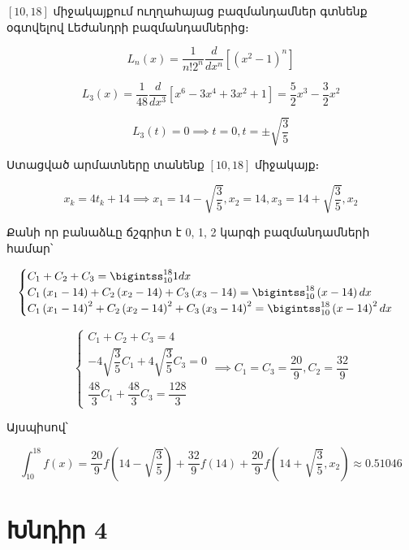 \documentclass{article}
\begin{document}
\begin{enumerate}
$\left[10, 18\right]$ միջակայքում ուղղահայաց բազմանդամներ գտնենք օգտվելով Լեժանդրի բազմանդամներից։

			$$L_n\left(x\right) = \dfrac{1}{n ! 2 ^ {n}} \frac{d}{d x^{n}} \left[\left(x ^ {2} - 1\right) ^ {n} \right]$$

			$$L_3\left(x\right) = \dfrac{1}{48}\dfrac{d}{dx^{3}}\left[x ^ {6} - 3x^4 + 3x^2 +1\right] = \dfrac{5}{2} x^{3} - \dfrac{3}{2} x ^ {2}$$

			$$L_3\left(t\right) = 0 \implies t = 0, t = \pm \sqrt{\dfrac{3}{5}}$$

 
Ստացված արմատները տանենք $\left[10, 18\right]$ միջակայք։

							$$x_{k} = 4 t_{k} + 14 \implies x_{1} = 14 - \sqrt{\dfrac{3}{5}}, x_{2} = 14, x_{3} = 14 + \sqrt{\dfrac{3}{5}}, x_{2}$$


Քանի որ բանաձևը ճշգրիտ է 0, 1, 2 կարգի բազմանդամների համար՝

$$
\begin{cases}
 C_{1} + C_{2} + C_{3} = \bigintss_{10}^{18}1dx \\
 C_{1}\left(x_{1} - 14\right) + C_{2}\left(x_{2} - 14\right) + C_{3}\left(x_{3} - 14\right) = \bigintss_{10}^{18}\left(x - 14\right)dx \\
 C_{1}\left(x_{1} - 14\right)^{2} + C_{2}\left(x_{2} - 14\right)^{2} + C_{3}\left(x_{3} - 14\right)^{2} = \bigintss_{10}^{18}\left(x - 14\right)^{2}dx

\end{cases}
$$

$$
\begin{cases}
 C_{1} + C_{2} + C_{3} = 4 \\
 -4\sqrt{\dfrac{3}{5}}C_{1}  + 4\sqrt{\dfrac{3}{5}} C_{3} = 0\\
\dfrac{48}{3}C_{1}+ \dfrac{48}{3} C_{3} = \dfrac{128}{3} 

\end{cases} \implies C_{1} = C_{3} = \dfrac{20}{9}, C_{2} = \dfrac{32}{9}
$$

Այսպիսով՝

			$$\int_{10}^{18} f \left(x\right) = \dfrac{20}{9} f\left(14 - \sqrt{\dfrac{3}{5}}\right)+\dfrac{32}{9} f\left(14\right)+\dfrac{20}{9} f\left(14 + \sqrt{\dfrac{3}{5}}, x_{2}\right) \approx 0.51046$$
\end{enumerate}

\newpage


\section*{Խնդիր 4}
\end{document}
